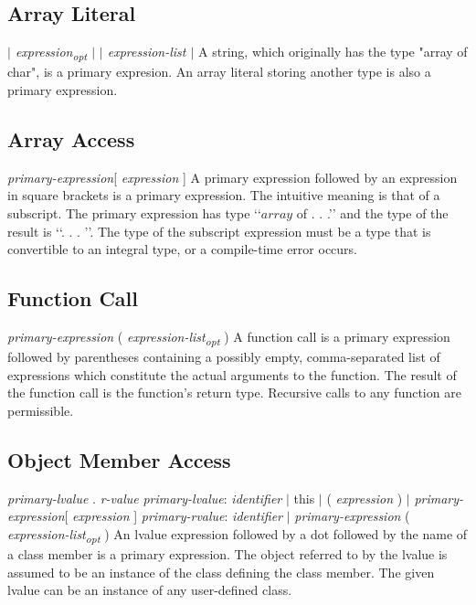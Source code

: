 \begin{homeworkProblem}
    \subsection{Array Literal}
    \textit{$|$ expression\textsubscript{opt} $|$ }
    \newline
    \textit{$|$ expression-list $|$ }
    \newline
    A string, which originally has the type "array of char", is a primary expresion. An array literal storing another type is also a primary expression.

    \subsection{Array Access}

    \textit{primary-expression}[ \textit{expression} ]
    \newline
    A primary expression followed by an expression in square brackets is a primary expression. The intuitive meaning is that of a subscript. The primary expression has type ‘‘$array$ of . . .’’ and the type of the result is ‘‘. . . ’’. The type of the subscript expression must be a type that is convertible to an integral type, or a compile-time error occurs.

    \subsection{Function Call}
    \textit{primary-expression} ( \textit{expression-list\textsubscript{opt}} )
    \newline
    A function call is a primary expression followed by parentheses containing a possibly empty, comma-separated
    list of expressions which constitute the actual arguments to the function. The result of the function call is the function's return type. Recursive calls to any function are permissible.

    \subsection{Object Member Access}
    \textit{primary-lvalue} . \textit{r-value}
    \newline
    \textit{primary-lvalue}: \textit{identifier} $|$ this $|$ ( \textit{expression} ) $|$ \textit{primary-expression}[ \textit{expression} ]
    \newline
    \textit{primary-rvalue}: \textit{identifier} $|$ \textit{primary-expression} ( \textit{expression-list\textsubscript{opt}} )
    \newline
	An lvalue expression followed by a dot followed by the name of a class member is a primary expression. The object referred to by the lvalue is assumed to be an instance of the class defining the class member. The given lvalue can be an instance of any user-defined class.


\end{homeworkProblem}

